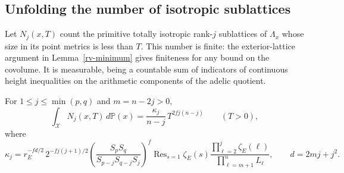 \subsection{Unfolding the number of isotropic sublattices}

Let $N_j(x,T)$ count the primitive totally isotropic
rank-$j$ sublattices of $\Lambda_x$ whose size in its
point metrics is less than $T$.  This number is finite:
the exterior-lattice argument in Lemma~\ref{rv-minimum}
gives finiteness for any bound on the covolume.
It is measurable, being a countable sum of indicators
of continuous height inequalities on the arithmetic
components of the adelic quotient.

\begin{proposition}\label{rv-mean-value}
For $1\le j\le\min(p,q)$ and $m=n-2j>0$,
\begin{equation}\label{rv-mean-value-formula}
 \int_{\mathcal X}N_j(x,T)\,d\mathbb P(x)
       =\frac{\kappa_j}{n-j}\,
                        T^{2fj(n-j)}\qquad(T>0),
\end{equation}
where
\begin{equation}\label{rv-kappa}
 \kappa_j=
 r_E^{-fd/2}\,2^{-fj(j+1)/2}
 \left(\frac{S_pS_q}{S_{p-j}S_{q-j}S_j}\right)^f
 \operatorname{Res}_{s=1}\zeta_E(s)
 \frac{\prod_{\ell=2}^{j}\zeta_E(\ell)}
      {\prod_{\ell=m+1}^{n}L_\ell},
 \qquad d=2mj+j^2 .
\end{equation}
\end{proposition}
